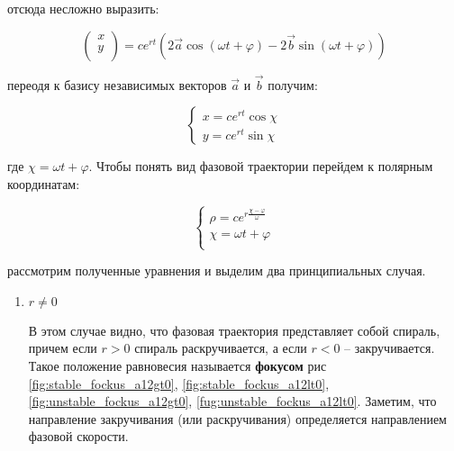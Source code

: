 \begin{enumerate}
  отсюда несложно выразить:

  \begin{equation}
    \begin{pmatrix}
      x \\ 
      y \\
    \end{pmatrix} = 
    c e^{r t} (2 \vec{a} \cos (\omega t + \varphi) - 2 \vec{b} \sin (\omega t + \varphi))
  \end{equation}

  переодя к базису независимых векторов $\vec{a}$ и $\vec{b}$ получим:

  \begin{equation}
    \begin{cases}
      x = c e^{r t} \cos {\chi} \\
      y = c e^{r t} \sin {\chi}
    \end{cases}
  \end{equation}
  
  где $\chi = \omega t + \varphi$. Чтобы понять вид фазовой траектории перейдем к полярным координатам:

  \begin{equation}
    \begin{cases}
      \rho = c e^{r \frac{\chi - \varphi}{\omega}} \\
      \chi = \omega t + \varphi \\
    \end{cases}
  \end{equation}

  рассмотрим полученные уравнения и выделим два принципиальных случая.

  \begin{enumerate}
    \item $r \neq 0$
    
    В этом случае видно, что фазовая траектория представляет собой спираль, причем если $r > 0$ спираль раскручивается, а если $r < 0$ -- закручивается. Такое положение равновесия называется \textbf{фокусом} рис \ref{fig:stable_fockus_a12gt0}, \ref{fig:stable_fockus_a12lt0}, \ref{fig:unstable_fockus_a12gt0}, \ref{fug:unstable_fockus_a12lt0}. Заметим, что направление закручивания (или раскручивания) определяется направлением фазовой скорости.


\end{enumerate}
\end{enumerate}
